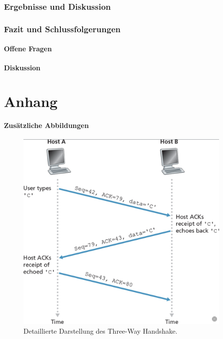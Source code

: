 \documentclass[paper=a4,fontsize=12pt,ngerman]{scrartcl}
\begin{document}
\section{Ergebnisse und Diskussion}


\section{Fazit und Schlussfolgerungen}


\subsection{Offene Fragen}


\subsection{Diskussion}


\clearpage
\renewcommand\refname{Literaturverzeichnis}




\clearpage
\appendix
\part*{Anhang}


\subsection{Zusätzliche Abbildungen}

\begin{figure}[ht]
    \centering
    \includegraphics[height=10cm]{graphics/3way.png}
    \caption{Detaillierte Darstellung des Three-Way Handshake.}
    \label{fig:three-way-handshake}
\end{figure}
\end{document}
